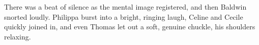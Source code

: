 There was a beat of silence as the mental image registered, and then Baldwin snorted loudly. Philippa burst into a bright, ringing laugh, Celine and Cecile quickly joined in, and even Thomas let out a soft, genuine chuckle, his shoulders relaxing.

